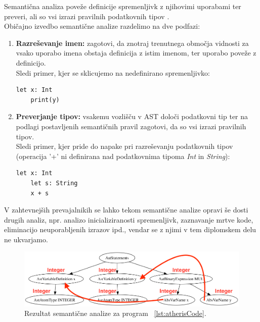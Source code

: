 \documentclass[a4paper, 12p]{book}
\begin{document}
Semantična analiza poveže definicije spremenljivk z njihovimi uporabami ter preveri, ali so vsi izrazi pravilnih podatkovnih tipov \cite{modernCompiler}. \\
\indent Običajno izvedbo semantične analize razdelimo na dve podfazi:
\begin{enumerate}
	\item \textbf{Razreševanje imen:} zagotovi, da znotraj trenutnega območja vidnosti za vsako uporabo imena obstaja definicija z istim imenom, ter uporabo poveže z definicijo. \\
	Sledi primer, kjer se sklicujemo na nedefinirano spremenljivko:
	\renewcommand{\lstlistingname}{Program}
	\begin{lstlisting}[caption={Primer programa, kjer spremenljivka \textit{y} ni definirana.}, label={lst:atherisCodeNameError},captionpos=b]
	let x: Int
	print(y)
	\end{lstlisting}
	
	\item \textbf{Preverjanje tipov:} vsakemu vozlišču v AST določi podatkovni tip ter na podlagi postavljenih semantičnih pravil zagotovi, da so vsi izrazi pravilnih tipov. \\
	Sledi primer, kjer pride do napake pri razreševanju podatkovnih tipov (operacija '+' ni definirana nad podatkovnima tipoma \textit{Int} in \textit{String}):
	
	\renewcommand{\lstlistingname}{Program}
	\begin{lstlisting}[caption={Primer programa, kjer je napaka v podatkovnih tipih.},label={lst:atherisCodeTypeError},captionpos=b]
	let x: Int
	let s: String
	x + s
	\end{lstlisting}
	
\end{enumerate}

V zahtevnejših prevajalnikih se lahko tekom semantične analize opravi še dosti drugih analiz, npr. analizo inicializiranosti spremenljivk, zaznavanje mrtve kode, eliminacijo neuporabljenih izrazov ipd., vendar se z njimi v tem diplomskem delu ne ukvarjamo.

\begin{figure}[h]
	\begin{center}
		\includegraphics[width=1\textwidth]{resources/astSeman.png}
	\end{center}
	\caption{Rezultat semantične analize za program ~\ref{lst:atherisCode}.}
	\label{image:astSeman}
\end{figure}
\end{document}
